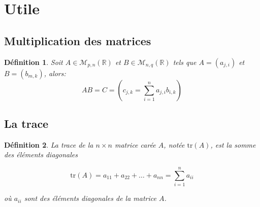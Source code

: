 \documentclass[a4paper]{article}
\newcommand{\R}{\mathbb{R}}
\newtheorem{definition}{Définition}[section]
\begin{document}
\section{Utile}
\subsection{Multiplication des matrices}
\begin{definition}
    Soit $A \in \mathcal{M}_{p, n}(\R)$ et $B \in \mathcal{M}_{n, q}(\R)$ tels que $A = (a_{j, i})$ et $B = (b_{m, k})$, alors:
    \[
        AB = C = (c_{j, k} = \sum_{i=1}^{n} a_{j, i}b_{i, k})
    \] 
\end{definition}
\subsection{La trace}
\begin{definition}
    La trace de la \( n \times n \) matrice carée \( A \), notée \( \text{tr}(A) \), est la somme des éléments diagonales

    \[
        \text{tr}(A) = a_{11} + a_{22} + \dots + a_{nn} = \sum_{i=1}^{n} a_{ii}
    \]

    où \( a_{ii} \) sont des éléments diagonales de la matrice \( A \). 
\end{definition}
\end{document}
